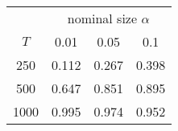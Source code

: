% 
\begin{tabular}{cccc}
  \hline
  & \multicolumn{3}{c}{nominal size $\alpha$} \\
 $T$ & 0.01 & 0.05 & 0.1 \\
 \hline
250 & 0.112 & 0.267 & 0.398 \\ 
  500 & 0.647 & 0.851 & 0.895 \\ 
  1000 & 0.995 & 0.974 & 0.952 \\ 
   \hline
\end{tabular}

